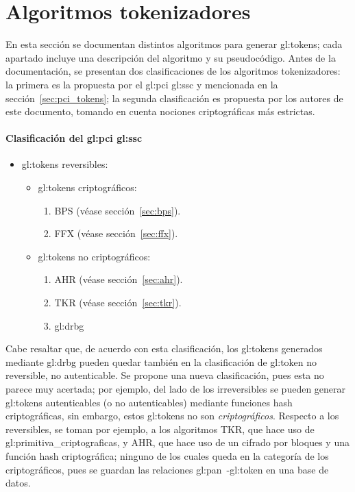 %
%

\section{Algoritmos tokenizadores}
\label{sec:algoritmos}

En esta sección se documentan distintos algoritmos para generar
\glspl{gl:token}; cada apartado incluye una descripción del
algoritmo y su pseudocódigo. Antes de la documentación, se presentan
dos clasificaciones de los algoritmos tokenizadores: la primera es la propuesta
por el \gls{gl:pci} \gls{gl:ssc} y mencionada en la
sección~\ref{sec:pci_tokens}; la segunda clasificación es propuesta por los
autores de este documento, tomando en cuenta nociones criptográficas más
estrictas.

\paragraph{Clasificación del \texorpdfstring{\acrlong{gl:pci}}{PCI} \texorpdfstring{\acrlong{gl:ssc}}{SSC}}
\begin{itemize}
  \item \Glspl{gl:token} reversibles:
    \begin{itemize}
      \item \Glspl{gl:token} criptográficos:
        \begin{enumerate}
          \item BPS (véase sección~\ref{sec:bps}).
          \item FFX (véase sección~\ref{sec:ffx}).
        \end{enumerate}
      \item \Glspl{gl:token} no criptográficos:
        \begin{enumerate}
          \item AHR (véase sección~\ref{sec:ahr}).
          \item TKR (véase sección~\ref{sec:tkr}).
          \item \gls{gl:drbg}
        \end{enumerate}
    \end{itemize}
\end{itemize}

Cabe resaltar que, de acuerdo con esta clasificación, los \glspl{gl:token}
generados mediante \gls{gl:drbg} pueden quedar también en la clasificación
de \gls{gl:token} no reversible, no autenticable. Se propone una nueva
clasificación, pues esta no parece muy acertada; por ejemplo, del lado de los
irreversibles se pueden generar \glspl{gl:token} autenticables (o no
autenticables) mediante funciones hash criptográficas, sin embargo, estos
\glspl{gl:token} no son \textit{criptográficos}. Respecto a los reversibles,
se toman por ejemplo, a los algoritmos TKR, que hace uso de
\glspl{gl:primitiva_criptografica}, y AHR, que hace uso de un cifrado
por bloques y una función hash criptográfica; ninguno de los cuales queda en
la categoría de los criptográficos, pues se guardan las relaciones
\gls{gl:pan}~-\gls{gl:token} en una base de datos.

